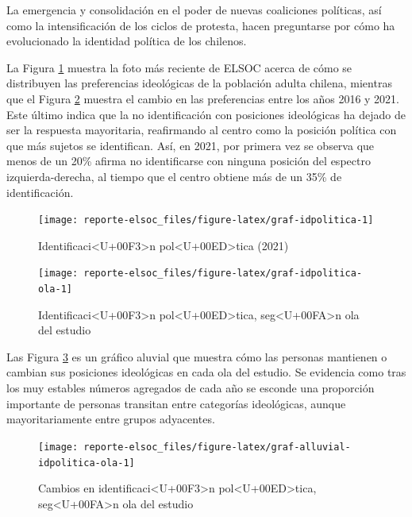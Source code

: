 \documentclass[
  12pt,
]{book}
\begin{document}
La emergencia y consolidación en el poder de nuevas coaliciones políticas, así como la intensificación de los ciclos de protesta, hacen preguntarse por cómo ha evolucionado la identidad política de los chilenos.

La Figura \ref{fig:graf-idpolitica} muestra la foto más reciente de ELSOC acerca de cómo se distribuyen las preferencias ideológicas de la población adulta chilena, mientras que el Figura \ref{fig:graf-idpolitica-ola} muestra el cambio en las preferencias entre los años 2016 y 2021. Este último indica que la no identificación con posiciones ideológicas ha dejado de ser la respuesta mayoritaria, reafirmando al centro como la posición política con que más sujetos se identifican. Así, en 2021, por primera vez se observa que menos de un 20\% afirma no identificarse con ninguna posición del espectro izquierda-derecha, al tiempo que el centro obtiene más de un 35\% de identificación.

\begin{figure}

{\centering \texttt{[image: reporte-elsoc\_files/figure-latex/graf-idpolitica-1]} 

}

\caption{Identificaci<U+00F3>n pol<U+00ED>tica (2021)}\label{fig:graf-idpolitica}
\end{figure}

\begin{figure}

{\centering \texttt{[image: reporte-elsoc\_files/figure-latex/graf-idpolitica-ola-1]} 

}

\caption{Identificaci<U+00F3>n pol<U+00ED>tica, seg<U+00FA>n ola del estudio}\label{fig:graf-idpolitica-ola}
\end{figure}

Las Figura \ref{fig:graf-alluvial-idpolitica-ola} es un gráfico aluvial que muestra cómo las personas mantienen o cambian sus posiciones ideológicas en cada ola del estudio. Se evidencia como tras los muy estables números agregados de cada año se esconde una proporción importante de personas transitan entre categorías ideológicas, aunque mayoritariamente entre grupos adyacentes.

\begin{figure}

{\centering \texttt{[image: reporte-elsoc\_files/figure-latex/graf-alluvial-idpolitica-ola-1]} 

}

\caption{Cambios en identificaci<U+00F3>n pol<U+00ED>tica, seg<U+00FA>n ola del estudio}\label{fig:graf-alluvial-idpolitica-ola}
\end{figure}
\end{document}
